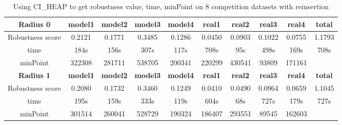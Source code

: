 \documentclass{article}
\begin{document}
	
	\begin{table}[!htbp]
	\begin{adjustwidth}{-1cm}{}		
		\begin{threeparttable}		
			\centering
			\caption{Using CI\_HEAP to get robustness value, time, minPoint on 8 competition datasets with reinsertion}
			\label{tab:table7}
			\begin{tabular}{|c|c|c|c|c|c|c|c|c|c|}
				\hline
				\textbf{Radius 0} & \textbf{model1} & \textbf{model2} & \textbf{model3} & \textbf{model4} & \textbf{real1} & \textbf{real2} & \textbf{real3} & \textbf{real4} & \textbf{total} \\ \hline
				Robustness score                 & 0.2121          & 0.1771          & 0.3485          & 0.1286          & 0.0450         & 0.0903         & 0.1022         & 0.0755         & 1.1793         \\ \hline
				time                             & 184s            & 156s            & 307s            & 117s            & 708s           & 95s            & 498s           & 169s           & 708s           \\ \hline
				minPoint                         & 322308          & 281711          & 538705          & 200341          & 220299         & 430541         & 93809          & 171161         &                \\ \hline
				
				\textbf{Radius 1} & \textbf{model1} & \textbf{model2} & \textbf{model3} & \textbf{model4} & \textbf{real1} & \textbf{real2} & \textbf{real3} & \textbf{real4} & \textbf{total} \\ \hline
				Robustness score                 & 0.2080          & 0.1732          & 0.3460          & 0.1249          & 0.0410         & 0.0490         & 0.0964         & 0.0659         & 1.1045         \\ \hline
				time                             & 195s            & 159s            & 333s            & 119s            & 604s           & 68s            & 727s           & 179s           & 727s           \\ \hline
				minPoint                         & 301514          & 260041          & 528729          & 190324          & 186407         & 293551         & 89545          & 162603         &                \\ \hline
				

\end{tabular}
\end{threeparttable}
\end{adjustwidth}
\end{table}
\end{document}
